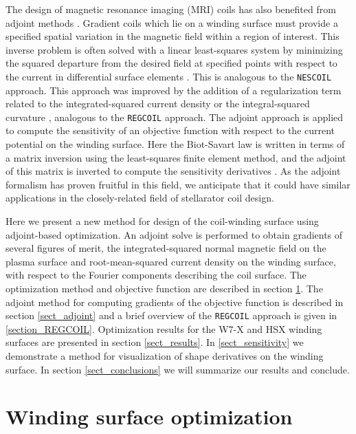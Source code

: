 \documentclass[aps,unsortedaddress]{revtex4-1}
\begin{document}

The design of magnetic resonance imaging (MRI) coils has also benefited from adjoint methods \cite{Jia2014}. 
Gradient coils which lie on a winding surface must provide a specified spatial variation in the magnetic field within a region of interest. This inverse problem is often solved with a linear least-squares system by minimizing the squared departure from the desired field at specified points with respect to the current in differential surface elements \cite{Turner1993}. This is analogous to the \texttt{NESCOIL} \cite{Merkel1987} approach. This approach was improved by the addition of a regularization term related to the integrated-squared current density \cite{Forbes2005} or the integral-squared curvature \cite{Forbes2001}, analogous to the \texttt{REGCOIL} approach. The adjoint approach is applied to compute the sensitivity of an objective function with respect to the current potential on the winding surface. Here the Biot-Savart law is written in terms of a matrix inversion using the least-squares finite element method, and the adjoint of this matrix is inverted to compute the sensitivity derivatives \cite{Jia2014}. As the adjoint formalism has proven fruitful in this field, we anticipate that it could have similar applications in the closely-related field of stellarator coil design. 

Here we present a new method for design of the coil-winding surface using adjoint-based optimization. An adjoint solve is performed to obtain gradients of several figures of merit, the integrated-squared normal magnetic field on the plasma surface and root-mean-squared current density on the winding surface, with respect to the Fourier components describing the coil surface. The optimization method and objective function are described in section \ref{sect_opt}. The adjoint method for computing gradients of the objective function is described in section \ref{sect_adjoint} and a brief overview of the \texttt{REGCOIL} approach is given in \ref{section_REGCOIL}. Optimization results for the W7-X and HSX winding surfaces are presented in section \ref{sect_results}. In \ref{sect_sensitivity} we demonstrate a method for visualization of shape derivatives on the winding surface. In section \ref{sect_conclusions} we will summarize our results and conclude. 

\section{Winding surface optimization}
\label{sect_opt}
\FloatBarrier
\end{document}
